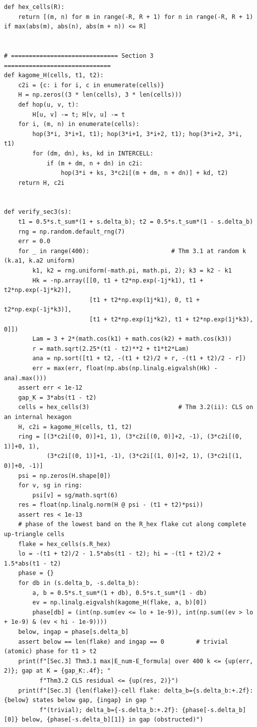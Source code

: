 \documentclass[11pt,a4paper]{article}
\theoremstyle{definition}
\theoremstyle{remark}
\begin{document}
\begin{lstlisting}
def hex_cells(R):
    return [(m, n) for m in range(-R, R + 1) for n in range(-R, R + 1) if max(abs(m), abs(n), abs(m + n)) <= R]


# ============================== Section 3 ==============================
def kagome_H(cells, t1, t2):
    c2i = {c: i for i, c in enumerate(cells)}
    H = np.zeros((3 * len(cells), 3 * len(cells)))
    def hop(u, v, t):
        H[u, v] -= t; H[v, u] -= t
    for i, (m, n) in enumerate(cells):
        hop(3*i, 3*i+1, t1); hop(3*i+1, 3*i+2, t1); hop(3*i+2, 3*i, t1)
        for (dm, dn), ks, kd in INTERCELL:
            if (m + dm, n + dn) in c2i:
                hop(3*i + ks, 3*c2i[(m + dm, n + dn)] + kd, t2)
    return H, c2i


def verify_sec3(s):
    t1 = 0.5*s.t_sum*(1 + s.delta_b); t2 = 0.5*s.t_sum*(1 - s.delta_b)
    rng = np.random.default_rng(7)
    err = 0.0
    for _ in range(400):                       # Thm 3.1 at random k (k.a1, k.a2 uniform)
        k1, k2 = rng.uniform(-math.pi, math.pi, 2); k3 = k2 - k1
        Hk = -np.array([[0, t1 + t2*np.exp(-1j*k1), t1 + t2*np.exp(-1j*k2)],
                        [t1 + t2*np.exp(1j*k1), 0, t1 + t2*np.exp(-1j*k3)],
                        [t1 + t2*np.exp(1j*k2), t1 + t2*np.exp(1j*k3), 0]])
        Lam = 3 + 2*(math.cos(k1) + math.cos(k2) + math.cos(k3))
        r = math.sqrt(2.25*(t1 - t2)**2 + t1*t2*Lam)
        ana = np.sort([t1 + t2, -(t1 + t2)/2 + r, -(t1 + t2)/2 - r])
        err = max(err, float(np.abs(np.linalg.eigvalsh(Hk) - ana).max()))
    assert err < 1e-12
    gap_K = 3*abs(t1 - t2)
    cells = hex_cells(3)                         # Thm 3.2(ii): CLS on an internal hexagon
    H, c2i = kagome_H(cells, t1, t2)
    ring = [(3*c2i[(0, 0)]+1, 1), (3*c2i[(0, 0)]+2, -1), (3*c2i[(0, 1)]+0, 1),
            (3*c2i[(0, 1)]+1, -1), (3*c2i[(1, 0)]+2, 1), (3*c2i[(1, 0)]+0, -1)]
    psi = np.zeros(H.shape[0])
    for v, sg in ring:
        psi[v] = sg/math.sqrt(6)
    res = float(np.linalg.norm(H @ psi - (t1 + t2)*psi))
    assert res < 1e-13
    # phase of the lowest band on the R_hex flake cut along complete up-triangle cells
    flake = hex_cells(s.R_hex)
    lo = -(t1 + t2)/2 - 1.5*abs(t1 - t2); hi = -(t1 + t2)/2 + 1.5*abs(t1 - t2)
    phase = {}
    for db in (s.delta_b, -s.delta_b):
        a, b = 0.5*s.t_sum*(1 + db), 0.5*s.t_sum*(1 - db)
        ev = np.linalg.eigvalsh(kagome_H(flake, a, b)[0])
        phase[db] = (int(np.sum(ev <= lo + 1e-9)), int(np.sum((ev > lo + 1e-9) & (ev < hi - 1e-9))))
    below, ingap = phase[s.delta_b]
    assert below == len(flake) and ingap == 0         # trivial (atomic) phase for t1 > t2
    print(f"[Sec.3] Thm3.1 max|E_num-E_formula| over 400 k <= {up(err, 2)}; gap at K = {gap_K:.4f}; "
          f"Thm3.2 CLS residual <= {up(res, 2)}")
    print(f"[Sec.3] {len(flake)}-cell flake: delta_b={s.delta_b:+.2f}: {below} states below gap, {ingap} in gap "
          f"(trivial); delta_b={-s.delta_b:+.2f}: {phase[-s.delta_b][0]} below, {phase[-s.delta_b][1]} in gap (obstructed)")



\end{lstlisting}
\end{document}
